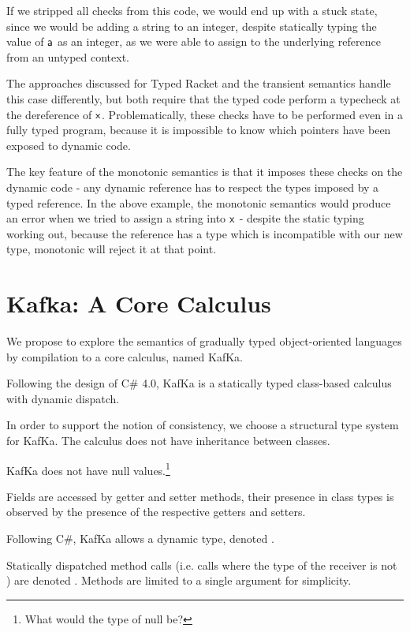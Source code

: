 \documentclass[a4paper,USenglish]{tex/lipics-v2016}
\begin{document}
If we stripped all checks from this code, we would end up with a stuck
state, since we would be adding a string to an integer, despite statically
typing the value of ${\sf{a}}$ as an integer, as we were able to assign to the
underlying reference from an untyped context.

The approaches discussed for Typed Racket and the transient semantics
handle this case differently, but both require that the typed code perform
a typecheck at the dereference of ${\sf{x}}$. Problematically, these checks
have to be performed even in a fully typed program, because it is impossible
to know which pointers have been exposed to dynamic code.

The key feature of the monotonic semantics is that it imposes these checks
on the dynamic code - any dynamic reference has to respect the types imposed
by a typed reference. In the above example, the monotonic semantics would
produce an error when we tried to assign a string into ${\sf{x}}$ - despite the
static typing working out, because the reference has a type which is
incompatible with our new type, monotonic will reject it at that point.

\section{Kafka: A Core Calculus}
\newcommand{\name}{{\sf KafKa}\xspace}

We propose to explore the semantics of gradually typed object-oriented
languages by compilation to a core calculus, named \name.

Following the design of C\# 4.0, \name is a statically typed class-based
calculus with dynamic dispatch.

In order to support the notion of consistency, we choose a structural type
system for \name.  The calculus does not have inheritance between classes.

\name does not have null values.\footnote{What would the type of null be?}

Fields are accessed by getter and setter methods, their presence in class
types is observed by the presence of the respective getters and setters.


Following C\#, \name allows a dynamic type, denoted \any. 

Statically dispatched method calls (i.e. calls where the type of the
receiver is not \any) are denoted \Call\x\m\e. Methods are limited to a
single argument for simplicity.
\end{document}
